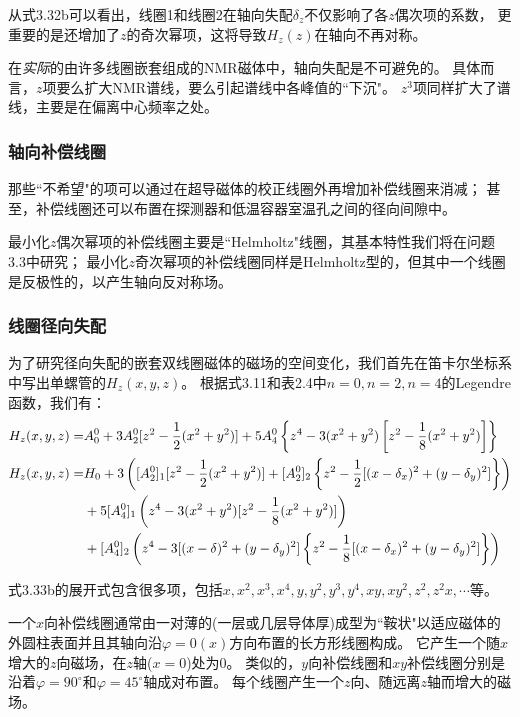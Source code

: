 从式3.32b可以看出，线圈1和线圈2在轴向失配$\delta_z$不仅影响了各$z$偶次项的系数，
更重要的是还增加了$z$的奇次幂项，这将导致$H_z(z)$在轴向不再对称。

在\textit{实际}的由许多线圈嵌套组成的NMR磁体中，轴向失配是不可避免的。
具体而言，$z$项要么扩大NMR谱线，要么引起谱线中各峰值的``下沉"。
$z^3$项同样扩大了谱线，主要是在偏离中心频率之处。

\subsubsection{轴向补偿线圈}
那些``不希望"的项可以通过在超导磁体的校正线圈外再增加补偿线圈来消减；
甚至，补偿线圈还可以布置在探测器和低温容器室温孔之间的径向间隙中。

最小化$z$偶次幂项的补偿线圈主要是``Helmholtz"线圈，其基本特性我们将在问题3.3中研究；
最小化$z$奇次幂项的补偿线圈同样是Helmholtz型的，但其中一个线圈是反极性的，以产生轴向反对称场。

\subsubsection{线圈径向失配}
为了研究径向失配的嵌套双线圈磁体的磁场的空间变化，我们首先在笛卡尔坐标系中写出单螺管的$H_z(x,y,z)$。
根据式3.11和表2.4中$n=0,n=2,n=4$的Legendre函数，我们有：
\begin{subequations}
	\begin{align}
  H_z(x,y,z)=&A_0^0+3A_2^0[z^2-\frac{1}{2}(x^2+y^2)]+5A_4^0\left\{z^4-3(x^2+y^2)\left[z^2-\frac{1}{8}(x^2+y^2)\right]\right\}\\
H_z(x,y,z)=&H_0+3\left([A_2^0]_1[z^2-\frac{1}{2}(x^2+y^2)]+[A_2^0]_2\left\{ z^2-\frac{1}{2}[(x-\delta_x)^2+(y-\delta_y)^2]\right\}\right)\\\notag
&+5[A_4^0]_1\left(z^4-3(x^2+y^2)[z^2-\frac{1}{8}(x^2+y^2)]\right)\\\notag
&+[A_4^0]_2\left(z^4-3[(x-\delta)^2+(y-\delta_y)^2]\left\{ z^2-\frac{1}{8}[(x-\delta_x)^2+(y-\delta_y)^2]\right\}\right) 
\end{align}
\end{subequations}

式3.33b的展开式包含很多项，包括$x,x^2,x^3,x^4,y,y^2,y^3,y^4,xy,xy^2,z^2,z^2x,\cdots$等。

一个$x$向补偿线圈通常由一对薄的(一层或几层导体厚)成型为``鞍状"以适应磁体的外圆柱表面并且其轴向沿$\varphi=0(x)$方向布置的长方形线圈构成。
它产生一个随$x$增大的$z$向磁场，在$z$轴($x=0$)处为0。
类似的，$y$向补偿线圈和$xy$补偿线圈分别是沿着$\varphi=90^\circ$和$\varphi=45^\circ$轴成对布置。
每个线圈产生一个$z$向、随远离$z$轴而增大的磁场。

